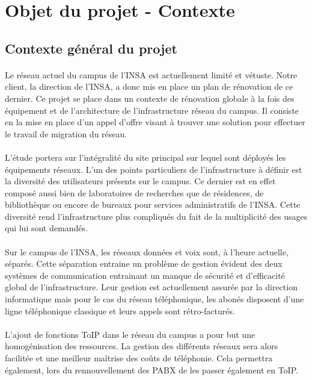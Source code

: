 \section{Objet du projet - Contexte}

\subsection{Contexte général du projet}

\paragraph{} Le réseau actuel du campus de l'INSA est actuellement limité et vétuste. Notre client, la direction de l'INSA, a donc mis en place un plan de rénovation de ce dernier. Ce projet se place dans un contexte de rénovation globale à la fois des équipement et de l'architecture de l'infrastructure réseau du campus. Il consiste en la mise en place d'un appel d'offre visant à trouver une solution pour effectuer le travail de migration du réseau.
\paragraph{} L'étude portera sur l'intégralité du site principal sur lequel sont déployés les équipements réseaux. L'un des points particuliers de l'infrastructure à définir est la diversité des utilisateurs présents sur le campus. Ce dernier est en effet composé aussi bien de laboratoires de recherches que de résidences, de bibliothèque ou encore de bureaux pour services administratifs de l'INSA. Cette diversité rend l'infrastructure plus compliqués du fait de la multiplicité des usages qui lui sont demandés.
\paragraph{} Sur le campus de l'INSA, les réseaux données et voix sont, à l'heure actuelle, séparés. Cette séparation entraine un problème de gestion évident des deux systèmes de communication entrainant un manque de sécurité et d'efficacité global de l'infrastructure. Leur gestion est actuellement assurée par la direction informatique mais pour le cas du réseau téléphonique, les abonés disposent d'une ligne téléphonique classique et leurs appels sont rétro-facturés.
\paragraph{} L'ajout de fonctions ToIP dans le réseau du campus a pour but une homogénisation des ressources. La gestion des différents réseaux sera alors facilitée et une meilleur maîtrise des coûts de téléphonie. Cela permettra également, lors du rennouvellement des PABX de les passer également en ToIP.

